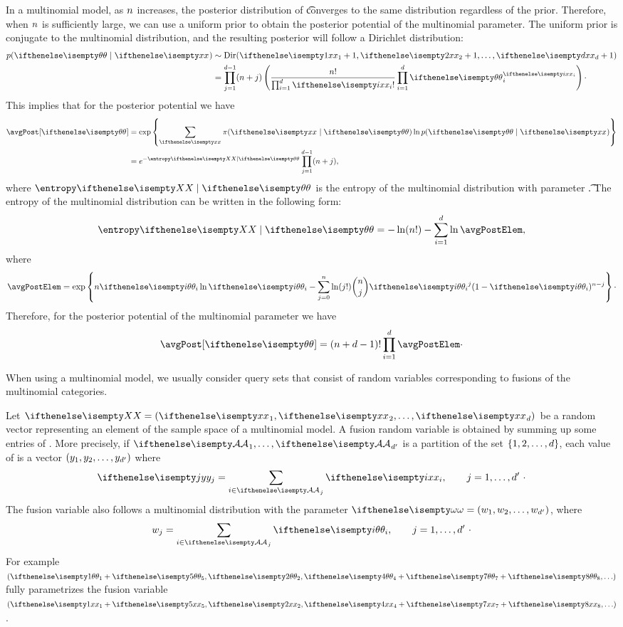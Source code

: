 In a multinomial model, as $n$ increases, the posterior distribution of \t converges to the same distribution
regardless of the prior.
Therefore, when $n$ is sufficiently large, we can use a uniform prior to obtain the posterior potential of the
multinomial parameter.
The uniform prior is conjugate to the multinomial distribution, and the resulting posterior will follow a Dirichlet
distribution:
\begin{align*}
    p(\t \mid \x) &\sim \text{Dir}(\x[1] + 1, \x[2] + 1, \ldots, \x[\mdim] + 1) \\
    &= \prod_{j = 1}^{\mdim - 1} (\msize + j) \left( \multi \right) \cdot
\end{align*}
This implies that for the posterior potential we have
\begin{align*}
    \avgPost[\t] &= \avgPostExpand{\t}{\x} \\
    &= e^{-\H} \prod_{j = 1}^{\mdim - 1} (\msize + j),
\end{align*}
where $\H$ is the entropy of the multinomial distribution with parameter \t.
The entropy of the multinomial distribution can be written in the following form:
\[
    \H =  - \ln(n!) - \sumDim \ln \avgPostElem,
\]
where
\begin{equation}
    \avgPostElem = \exp \left\{ n \t[i] \ln \t[i] -
    \sum_{j = 0}^{n} \ln(j!) \binom{n}{j} \t[i]^{j} (1 - \t[i])^{n - j} \right\} \cdot
    \label{eq:pp_multi_elem}
\end{equation}
Therefore, for the posterior potential of the multinomial parameter we have
\begin{equation}
    \avgPost[\t] = (\msize + \mdim - 1)! \prodDim \avgPostElem \cdot
    \label{eq:pp_multi}
\end{equation}

When using a multinomial model, we usually consider query sets that consist of random
variables corresponding to fusions of the multinomial categories. %

Let $\X = \vSeq{\x}{\mdim}$ be a random vector representing an element of the sample space of a multinomial model.
A fusion random variable \Y is obtained by summing up some entries of \X.
More precisely, if $\set{A}_1, \ldots, \set{A}_{\mdim'}$ is a partition of the set $\left\{ 1, 2, \ldots, d \right\}$, each value
of \Y is a vector $(y_1, y_2, \ldots, y_{d'})$ where
\[
    \rval[j]{y} = \sum_{i \in \set{A}_j} \x[i], \qquad j = 1, \ldots, \mdim'\ \cdot
\]
The fusion variable \Y also follows a multinomial distribution with the parameter $\w = \vSeq{\omegaElem}{\mdim'}$,
where
\[
    \omegaElem_j = \sum_{i \in \set{A}_j} \t[i], \qquad j = 1, \ldots, \mdim'\ \cdot
\]
For example $(\t[1] + \t[5], \t[2], \t[4] + \t[7] + \t[8],  \ldots)$ fully parametrizes the fusion variable
$(\x[1] + \x[5], \x[2], \x[4] + \x[7] + \x[8],  \ldots)$.

